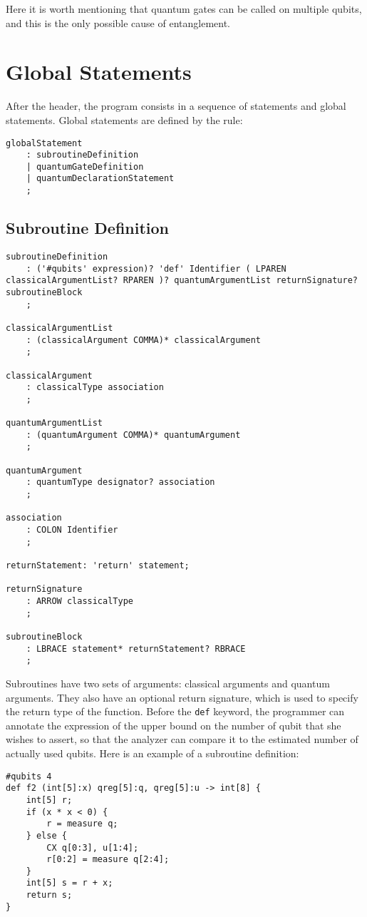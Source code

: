 \documentclass[12pt,a4paper]{report}
\theoremstyle{definition}
\theoremstyle{definition}
\theoremstyle{definition}
\begin{document}
Here it is worth mentioning that quantum gates can be called on multiple qubits, and this is the only possible cause of entanglement.\\




\section{Global Statements}
After the header, the program consists in a sequence of statements and global statements. Global statements are defined by the rule:
\begin{lstlisting}
globalStatement
    : subroutineDefinition
    | quantumGateDefinition
    | quantumDeclarationStatement
    ;
\end{lstlisting}



\subsection{Subroutine Definition}
\begin{lstlisting}
subroutineDefinition
    : ('#qubits' expression)? 'def' Identifier ( LPAREN classicalArgumentList? RPAREN )? quantumArgumentList returnSignature? subroutineBlock
    ;

classicalArgumentList
    : (classicalArgument COMMA)* classicalArgument
    ;

classicalArgument
    : classicalType association
    ;

quantumArgumentList
    : (quantumArgument COMMA)* quantumArgument
    ;

quantumArgument
    : quantumType designator? association
    ;

association
    : COLON Identifier
    ;

returnStatement: 'return' statement;

returnSignature
    : ARROW classicalType
    ;

subroutineBlock
    : LBRACE statement* returnStatement? RBRACE
    ;
\end{lstlisting}

Subroutines have two sets of arguments: classical arguments and quantum arguments. They also have an optional return signature, which is used to specify the return type of the function.
Before the \texttt{def} keyword, the programmer can annotate the expression of the upper bound on the number of qubit that she wishes to assert, so that the analyzer can compare it to the estimated number of actually used qubits.
Here is an example of a subroutine definition:
\begin{lstlisting}
#qubits 4
def f2 (int[5]:x) qreg[5]:q, qreg[5]:u -> int[8] {
    int[5] r;
    if (x * x < 0) {
        r = measure q;
    } else {
        CX q[0:3], u[1:4];
        r[0:2] = measure q[2:4];
    }
    int[5] s = r + x;
    return s;
}
\end{lstlisting}
\end{document}
